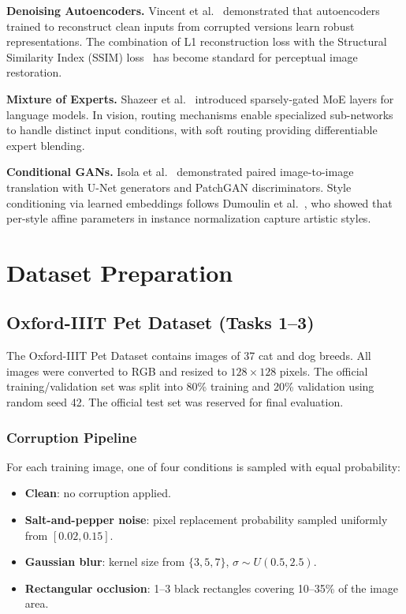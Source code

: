 \documentclass[conference]{IEEEtran}
\begin{document}
\textbf{Denoising Autoencoders.} Vincent et al.~\cite{vincent2008} demonstrated that autoencoders trained to reconstruct clean inputs from corrupted versions learn robust representations. The combination of L1 reconstruction loss with the Structural Similarity Index (SSIM) loss~\cite{wang2004ssim} has become standard for perceptual image restoration.

\textbf{Mixture of Experts.} Shazeer et al.~\cite{shazeer2017} introduced sparsely-gated MoE layers for language models. In vision, routing mechanisms enable specialized sub-networks to handle distinct input conditions, with soft routing providing differentiable expert blending.

\textbf{Conditional GANs.} Isola et al.~\cite{isola2017} demonstrated paired image-to-image translation with U-Net generators and PatchGAN discriminators. Style conditioning via learned embeddings follows Dumoulin et al.~\cite{dumoulin2017}, who showed that per-style affine parameters in instance normalization capture artistic styles.

\section{Dataset Preparation}

\subsection{Oxford-IIIT Pet Dataset (Tasks 1--3)}

The Oxford-IIIT Pet Dataset contains images of 37 cat and dog breeds. All images were converted to RGB and resized to $128 \times 128$ pixels. The official training/validation set was split into 80\% training and 20\% validation using random seed 42. The official test set was reserved for final evaluation.

\subsubsection{Corruption Pipeline}

For each training image, one of four conditions is sampled with equal probability:
\begin{itemize}
    \item \textbf{Clean}: no corruption applied.
    \item \textbf{Salt-and-pepper noise}: pixel replacement probability sampled uniformly from $[0.02, 0.15]$.
    \item \textbf{Gaussian blur}: kernel size from $\{3, 5, 7\}$, $\sigma \sim U(0.5, 2.5)$.
    \item \textbf{Rectangular occlusion}: 1--3 black rectangles covering 10--35\% of the image area.
\end{itemize}
\end{document}
